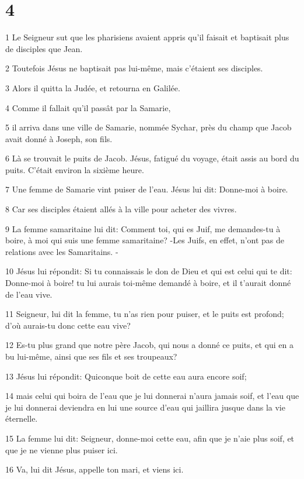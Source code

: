 \chapter{4}

\par 1 Le Seigneur sut que les pharisiens avaient appris qu'il faisait et baptisait plus de disciples que Jean.
\par 2 Toutefois Jésus ne baptisait pas lui-même, mais c'étaient ses disciples.
\par 3 Alors il quitta la Judée, et retourna en Galilée.
\par 4 Comme il fallait qu'il passât par la Samarie,
\par 5 il arriva dans une ville de Samarie, nommée Sychar, près du champ que Jacob avait donné à Joseph, son fils.
\par 6 Là se trouvait le puits de Jacob. Jésus, fatigué du voyage, était assis au bord du puits. C'était environ la sixième heure.
\par 7 Une femme de Samarie vint puiser de l'eau. Jésus lui dit: Donne-moi à boire.
\par 8 Car ses disciples étaient allés à la ville pour acheter des vivres.
\par 9 La femme samaritaine lui dit: Comment toi, qui es Juif, me demandes-tu à boire, à moi qui suis une femme samaritaine? -Les Juifs, en effet, n'ont pas de relations avec les Samaritains. -
\par 10 Jésus lui répondit: Si tu connaissais le don de Dieu et qui est celui qui te dit: Donne-moi à boire! tu lui aurais toi-même demandé à boire, et il t'aurait donné de l'eau vive.
\par 11 Seigneur, lui dit la femme, tu n'as rien pour puiser, et le puits est profond; d'où aurais-tu donc cette eau vive?
\par 12 Es-tu plus grand que notre père Jacob, qui nous a donné ce puits, et qui en a bu lui-même, ainsi que ses fils et ses troupeaux?
\par 13 Jésus lui répondit: Quiconque boit de cette eau aura encore soif;
\par 14 mais celui qui boira de l'eau que je lui donnerai n'aura jamais soif, et l'eau que je lui donnerai deviendra en lui une source d'eau qui jaillira jusque dans la vie éternelle.
\par 15 La femme lui dit: Seigneur, donne-moi cette eau, afin que je n'aie plus soif, et que je ne vienne plus puiser ici.
\par 16 Va, lui dit Jésus, appelle ton mari, et viens ici.

